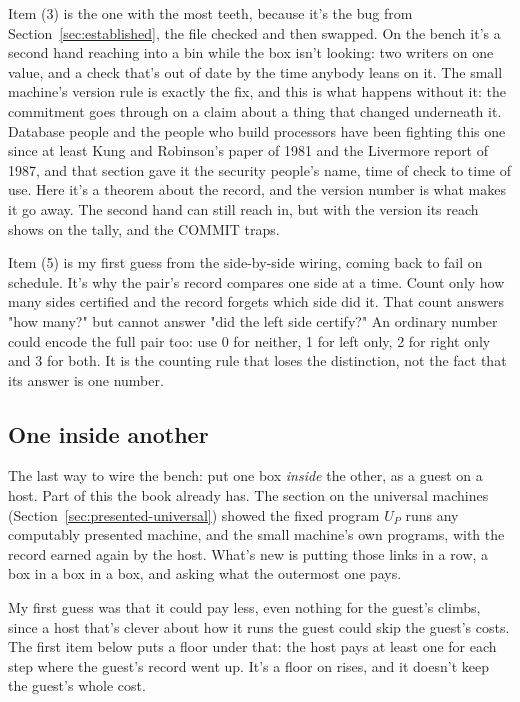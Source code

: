 \documentclass[11pt,twoside]{article}
\theoremstyle{thielethm}
\theoremstyle{thieledef}
\theoremstyle{thieledef}
\theoremstyle{thieledef}
\theoremstyle{thielethm}
\theoremstyle{thieleobs}
\theoremstyle{thielethm}
\begin{document}
Item (3) is the one with the most teeth, because it's the bug from Section~\ref{sec:established}, the file checked and then swapped. On the
bench it's a second hand reaching into a bin while the box isn't looking: two writers on one value, and
a check that's out of date by the time anybody leans on it. The small machine's version rule is
exactly the fix, and this is what happens without it: the commitment goes through on a claim about a
thing that changed underneath it. Database people and the people who build processors have been
fighting this one since at least Kung and Robinson's paper of 1981 and the Livermore report of 1987, and that section gave it the security people's name, time of check to time of use.
Here it's a theorem about the record, and the version number is what makes it go away. The second
hand can still reach in, but with the version its reach shows on the tally, and the COMMIT traps.

Item (5) is my first guess from the side-by-side wiring, coming back to fail on schedule. It's why the
pair's record compares one side at a time. Count only how many sides certified and the record forgets which side did it.
That count answers "how many?" but cannot answer "did the left side certify?"
An ordinary number could encode the full pair too: use 0 for neither, 1 for
left only, 2 for right only and 3 for both. It is the counting rule that loses
the distinction, not the fact that its answer is one number.

\subsection{One inside another}

The last way to wire the bench: put one box \emph{inside} the other, as a guest on a host. Part of
this the book already has. The section on the universal machines
(Section~\ref{sec:presented-universal}) showed the fixed program $U_P$ runs any
computably presented machine, and the small machine's own programs, with the record earned
again by the host. What's new is putting those links in a row, a box in a box in a box, and asking
what the outermost one pays.

My first guess was that it could pay less, even nothing for the guest's climbs, since a host that's
clever about how it runs the guest could skip the guest's costs. The first item below puts a floor under that: the host pays at
least one for each step where the guest's record went up. It's a floor on rises, and it doesn't
keep the guest's whole cost.
\end{document}
